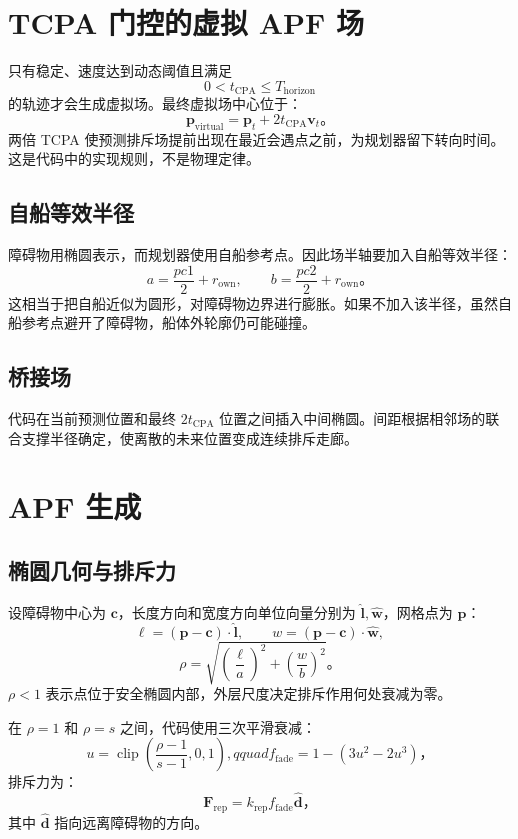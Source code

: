 \documentclass[UTF8,11pt,a4paper]{ctexart}
\begin{document}
\section{TCPA 门控的虚拟 APF 场}

只有稳定、速度达到动态阈值且满足
\[
0<t_{\mathrm{CPA}}\leq T_{\mathrm{horizon}}
\]
的轨迹才会生成虚拟场。最终虚拟场中心位于：
\[
\bm{p}_{\mathrm{virtual}}=\bm{p}_t+2t_{\mathrm{CPA}}\bm{v}_t。
\]
两倍 TCPA 使预测排斥场提前出现在最近会遇点之前，为规划器留下转向时间。这是代码中的实现规则，不是物理定律。

\subsection{自船等效半径}
障碍物用椭圆表示，而规划器使用自船参考点。因此场半轴要加入自船等效半径：
\[
a=\frac{pc1}{2}+r_{\mathrm{own}},\qquad b=\frac{pc2}{2}+r_{\mathrm{own}}。
\]
这相当于把自船近似为圆形，对障碍物边界进行膨胀。如果不加入该半径，虽然自船参考点避开了障碍物，船体外轮廓仍可能碰撞。

\subsection{桥接场}
代码在当前预测位置和最终 \(2t_{\mathrm{CPA}}\) 位置之间插入中间椭圆。间距根据相邻场的联合支撑半径确定，使离散的未来位置变成连续排斥走廊。



\section{APF 生成}

\subsection{椭圆几何与排斥力}
设障碍物中心为 \(\bm{c}\)，长度方向和宽度方向单位向量分别为 \(\hat{\bm{l}},\hat{\bm{w}}\)，网格点为 \(\bm{p}\)：
\[
\ell=(\bm{p}-\bm{c})\cdot\hat{\bm{l}},\qquad
w=(\bm{p}-\bm{c})\cdot\hat{\bm{w}},
\]
\[
\rho=\sqrt{\left(\frac{\ell}{a}\right)^2+\left(\frac{w}{b}\right)^2}。
\]
\(\rho<1\) 表示点位于安全椭圆内部，外层尺度决定排斥作用何处衰减为零。

在 \(\rho=1\) 和 \(\rho=s\) 之间，代码使用三次平滑衰减：
\[
u=\operatorname{clip}\left(\frac{\rho-1}{s-1},0,1\right),qquad
f_{\mathrm{fade}}=1-(3u^2-2u^3)，
\]
排斥力为：
\[
\bm{F}_{\mathrm{rep}}=k_{\mathrm{rep}}f_{\mathrm{fade}}\hat{\bm{d}}，
\]
其中 \(\hat{\bm{d}}\) 指向远离障碍物的方向。
\end{document}
